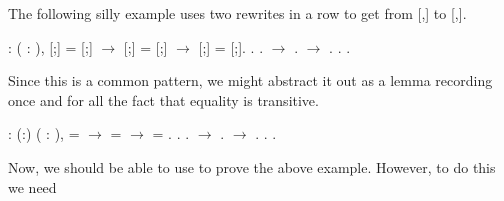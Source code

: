 \documentclass[12pt]{report}
\begin{document}
 The following silly example uses two rewrites in a row to
    get from [,] to [,]. \begin{coqdoccode}
\coqdocemptyline
\coqdocnoindent
{}  : \coqdockw{\ensuremath{\forall}} (      : ),\coqdoceol
\coqdocindent{2.50em}
[;] = [;] \ensuremath{\rightarrow}\coqdoceol
\coqdocindent{2.50em}
[;] = [;] \ensuremath{\rightarrow}\coqdoceol
\coqdocindent{2.50em}
[;] = [;].\coqdoceol
\coqdocnoindent
{}.\coqdoceol
\coqdocindent{1.00em}
        .\coqdoceol
\coqdocindent{1.00em}
 \ensuremath{\rightarrow} .  \ensuremath{\rightarrow} . . .\coqdoceol
\coqdocemptyline
\end{coqdoccode}
Since this is a common pattern, we might
    abstract it out as a lemma recording once and for all
    the fact that equality is transitive. \begin{coqdoccode}
\coqdocemptyline
\coqdocnoindent
{}  : \coqdockw{\ensuremath{\forall}} (:) (   : ),\coqdoceol
\coqdocindent{1.00em}
 =  \ensuremath{\rightarrow}  =  \ensuremath{\rightarrow}  = .\coqdoceol
\coqdocnoindent
{}.\coqdoceol
\coqdocindent{1.00em}
      .  \ensuremath{\rightarrow} .  \ensuremath{\rightarrow} .\coqdoceol
\coqdocindent{1.00em}
. .\coqdoceol
\coqdocemptyline
\end{coqdoccode}
Now, we should be able to use  to
    prove the above example.  However, to do this we need
\end{document}
